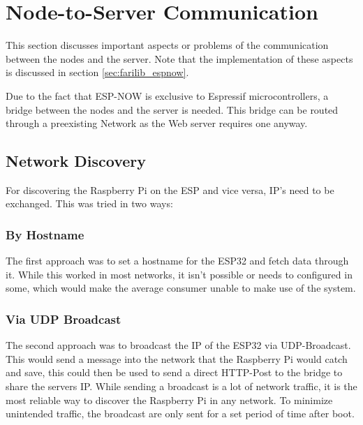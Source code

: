 \section{Node-to-Server Communication}
This section discusses important aspects or problems of the communication between
the nodes and the server. Note that the implementation of these aspects is discussed in section
\ref{sec:farilib_espnow}.

\vspace{0.5cm}

Due to the fact that ESP-NOW is exclusive to Espressif microcontrollers,
a bridge between the nodes and the server is needed. This bridge can be 
routed through a preexisting Network as the Web server requires 
one anyway.


    

    \subsection{Network Discovery}
    For discovering the Raspberry Pi on the ESP and vice versa,
    IP's need to be exchanged. This was tried in two ways:
        \subsubsection{By Hostname}
        The first approach was to set a hostname for the 
        ESP32 and fetch data through it. While this worked
        in most networks, it isn't possible or needs to 
        configured in some, which would make the average 
        consumer unable to make use of the system.

        \subsubsection{Via UDP Broadcast}
        The second approach was to broadcast the IP of the ESP32
        via UDP-Broadcast. This would send a 
        message into the network that the Raspberry Pi
        would catch and save, this could then be used to send a
        direct HTTP-Post to the bridge to share the servers IP. 
        While sending a broadcast is
        a lot of network traffic, it is the most reliable way
        to discover the Raspberry Pi in any network. To minimize
        unintended traffic, the broadcast are only sent for a set
        period of time after boot.